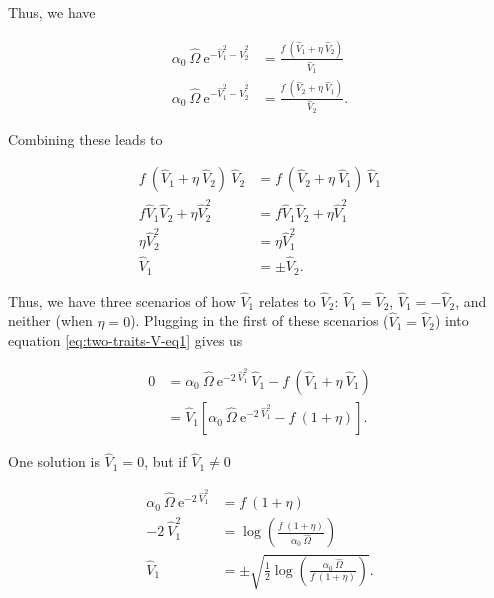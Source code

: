 \noindent Thus, we have

\begin{equation*}
\begin{split}
    \alpha_0 ~ \hat{\Omega} ~ \textrm{e}^{-\hat{V}_{1}^2 - \hat{V}_{2}^2} &=
        \frac{ f ~ ( \hat{V}_{1} + \eta ~ \hat{V}_{2} ) }{ \hat{V}_{1} } \\
    \alpha_0 ~ \hat{\Omega} ~ \textrm{e}^{-\hat{V}_{1}^2 - \hat{V}_{2}^2} &=
        \frac{ f ~ ( \hat{V}_{2} + \eta ~ \hat{V}_{1} ) }{ \hat{V}_{2} }
    \textrm{.}
\end{split}
\end{equation*}


\noindent Combining these leads to

\begin{equation*}
\begin{split}
    f ~ ( \hat{V}_{1} + \eta ~ \hat{V}_{2} ) ~ \hat{V}_{2} &=
        f ~ ( \hat{V}_{2} + \eta ~ \hat{V}_{1} ) ~ \hat{V}_{1} \\
    f \hat{V}_{1} \hat{V}_{2} + \eta \hat{V}_{2}^2 &=
        f \hat{V}_{1} \hat{V}_{2} + \eta \hat{V}_{1}^2 \\
    \eta \hat{V}_{2}^2 &= \eta \hat{V}_{1}^2 \\
    \hat{V}_{1} &= \pm \hat{V}_{2}
    \textrm{.}
\end{split}
\end{equation*}

Thus, we have three scenarios of how $\hat{V}_{1}$ relates to $\hat{V}_{2}$:
$\hat{V}_{1} = \hat{V}_{2}$, $\hat{V}_{1} = - \hat{V}_{2}$, and
neither (when $\eta = 0$).
Plugging in the first of these scenarios
($\hat{V}_{1} = \hat{V}_{2}$) into equation \ref{eq:two-traits-V-eq1}
gives us

\begin{equation*}
\begin{split}
    0 &= \alpha_0 ~ \hat{\Omega} ~ \textrm{e}^{-2 ~ \hat{V}_{1}^2 } ~ \hat{V}_{1}
        - f ~ ( \hat{V}_{1} + \eta ~ \hat{V}_{1} ) \\
    &= \hat{V}_{1} \left[ \alpha_0 ~ \hat{\Omega} ~ \textrm{e}^{-2 ~ \hat{V}_{1}^2 }
        - f ~ ( 1 + \eta ) \right]
    \textrm{.}
\end{split}
\end{equation*}

\noindent One solution is $\hat{V}_{1} = 0$, but if $\hat{V}_{1} \ne 0$


\begin{equation}
\begin{split}
    \alpha_0 ~ \hat{\Omega} ~ \textrm{e}^{-2 ~ \hat{V}_{1}^2 } &=
        f ~ ( 1 + \eta ) \\
    -2 ~ \hat{V}_{1}^2 &=
        \log \left( \frac{ f ~ ( 1 + \eta ) }{ \alpha_0 ~ \hat{\Omega} } \right) \\
    \hat{V}_{1} &= \pm \sqrt{\frac{1}{2}
        \log \left( \frac{ \alpha_0 ~ \hat{\Omega} }{ f ~ ( 1 + \eta ) } \right) }
    \textrm{.}
\end{split}
\label{eq:two-traits-V-eq5}
\end{equation}


